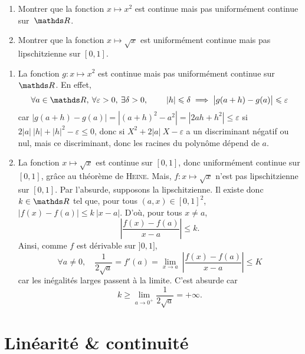 \begin{exo}
	\begin{slshape}
		\begin{enumerate}
			\item Montrer que la fonction $x \mapsto x^2$\/ est continue mais pas uniformément continue sur~$\R$.
			\item Montrer que la fonction $x \mapsto \sqrt{x}$\/ est uniformément continue mais pas lipschitzienne sur $[0,1]$.
		\end{enumerate}
	\end{slshape}

	\begin{enumerate}
		\item La fonction $g: x \mapsto x^2$\/ est continue mais pas uniformément continue sur $\R$.
			En effet, \[
				\forall a \in \R,\:\forall \varepsilon > 0,\: \exists \delta > 0,\: \quad\quad |h| \le \delta \implies \big|g(a+h) - g(a)\big| \le \varepsilon
			\]car $|g(a+h) - g(a)| = |(a+h)^2 - a^2| = |2ah + h^2| \le \varepsilon$\/ si $2|a|\:|h| + |h|^2 - \varepsilon \le 0$, donc si $X^2 + 2|a|\: X - \varepsilon$\/ a un discriminant négatif ou nul, mais ce discriminant, donc les racines du polynôme dépend de $a$.
		\item La fonction $x \mapsto \sqrt{x}$\/ est continue sur $[0,1]$, donc uniformément continue sur $[0,1]$, grâce au théorème de \textsc{Heine}.
			Mais, $f : x \mapsto \sqrt{x}$\/ n'est pas lipschitzienne sur $[0,1]$. Par l'absurde, supposons la lipschitzienne. Il existe donc $k \in \R$\/ tel que, pour tous $(a,x) \in [0,1]^2$, $\big|f(x) - f(a)\big| \le k\:|x-a|$. D'où, pour tous $x \neq a$, \[
				\left| \frac{f(x) - f(a)}{x - a} \right| \le k
				.\]Ainsi, comme $f$\/ est dérivable sur $]0,1]$, \[
				\forall a \neq 0, \quad \frac{1}{2\sqrt{a}} = f'(a) = \lim_{x\to a}\: \left| \frac{f(x) - f(a)}{x - a} \right| \le K
			\] car les inégalités larges passent à la limite.
			C'est absurde car \[
				k \ge \lim_{a\to 0^+} \frac{1}{2\sqrt{a}} = +\infty
			.\] 
	\end{enumerate}
\end{exo}

\section{Linéarité \& continuité}

